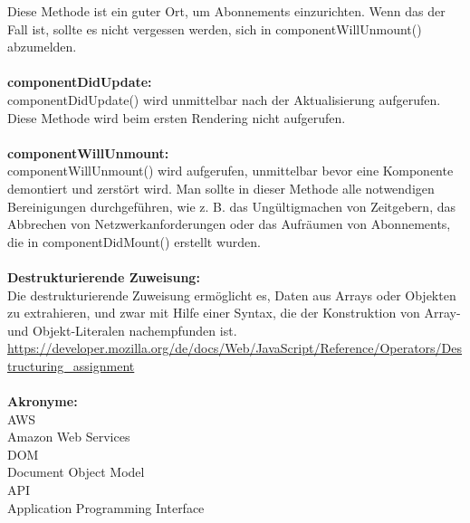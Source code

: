 Diese Methode ist ein guter Ort, um Abonnements einzurichten. Wenn das der Fall ist, sollte es nicht vergessen werden, sich in componentWillUnmount() abzumelden.
\\\\
\textbf{componentDidUpdate:}\\
componentDidUpdate() wird unmittelbar nach der Aktualisierung aufgerufen. Diese Methode wird beim ersten Rendering nicht aufgerufen.
\\\\
\textbf{componentWillUnmount:}\\
componentWillUnmount() wird aufgerufen, unmittelbar bevor eine Komponente demontiert und zerstört wird. Man sollte in dieser Methode alle notwendigen Bereinigungen durchgeführen, wie z. B. das Ungültigmachen von Zeitgebern, das Abbrechen von Netzwerkanforderungen oder das Aufräumen von Abonnements, die in componentDidMount() erstellt wurden.
\\\\
\textbf{Destrukturierende Zuweisung:}\\
Die destrukturierende Zuweisung ermöglicht es, Daten aus Arrays oder Objekten zu extrahieren, und zwar mit Hilfe einer Syntax, die der Konstruktion von Array- und Objekt-Literalen nachempfunden ist.
\url{https://developer.mozilla.org/de/docs/Web/JavaScript/Reference/Operators/Destructuring_assignment}
\\\\
\textbf{Akronyme:}\\
{AWS}\\{Amazon Web Services}\\
{DOM}\\{Document Object Model}\\
{API}\\{Application Programming Interface}\\

